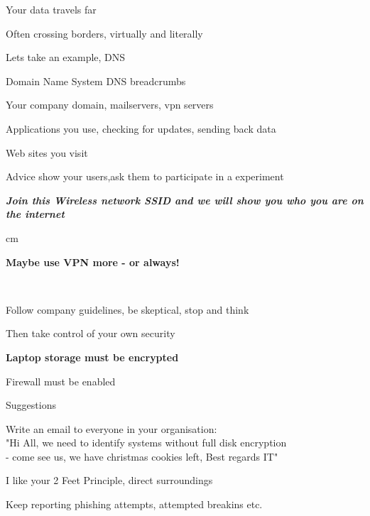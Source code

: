 \documentclass[Screen16to9,17pt,footrule]{foils}
\begin{document}


\begin{list2}
\item Your data travels far
\item Often crossing borders, virtually and literally
\end{list2}



\begin{list1}
\item Lets take an example, DNS
\item Domain Name System DNS breadcrumbs
\begin{list2}
\item Your company domain, mailservers, vpn servers
\item Applications you use, checking for updates, sending back data
\item Web sites you visit
\end{list2}
\vskip 1cm
\item Advice show your users,ask them to participate in a experiment
\end{list1}

\emph{\bf Join this Wireless network SSID and we will show you who you are on the internet}

 cm
\centerline{\bf\Large Maybe use VPN more - or always!}




{~}

\begin{list1}
\item Follow company guidelines, be skeptical, stop and think
\item Then take control of your own security
\item {\bf Laptop storage must be encrypted}
\item Firewall must be enabled
\item Suggestions
\begin{list2}
\item Write an email to everyone in your organisation:\\
"Hi All, we need to identify systems without full disk encryption \\
- come see us, we have christmas cookies left, Best regards IT"
\end{list2}
\vskip 5mm
\item I like your 2 Feet Principle, direct surroundings
\item Keep reporting phishing attempts, attempted breakins etc.
\end{list1}
\end{document}
